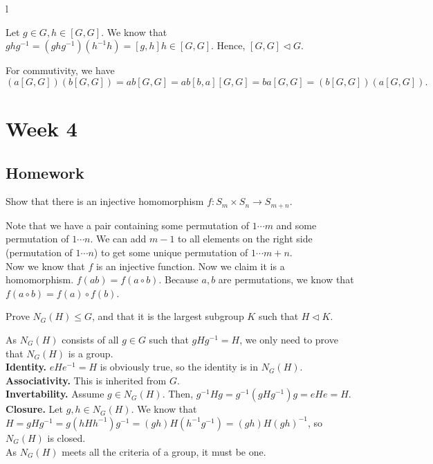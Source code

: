 l\documentclass{scrartcl}
\begin{document}
\begin{soln}
Let $g \in G, h \in [G,G].$ We know that $ghg^{-1} = (ghg^{-1})(h^{-1}h) = [g,h]h \in [G,G]$. Hence, $[G,G] \lhd G$. 

For commutivity, we have $$(a[G, G])(b[G, G]) = ab[G,G] = ab[b,a][G,G] = ba[G,G] = (b[G,G])(a[G,G]).$$
\end{soln}

\newpage
\section{Week 4}

\subsection{Homework}

\begin{problem}[1]
    Show that there is an injective homomorphism $f : S_m \times S_n \rightarrow S_{m+n}$.
\end{problem}

\begin{soln}
    Note that we have a pair containing some permutation of $1 \cdots m$ and some permutation of $1 \cdots n$. We can add $m-1$ to all elements on the right side (permutation of $1 \cdots n$) to get some unique permutation of $1 \cdots m+n$. \\
	Now we know that $f$ is an injective function. Now we claim it is a homomorphism. $f(ab) = f(a \circ b)$. Because $a,b$ are permutations, we know that $f(a \circ b) = f(a) \circ f(b)$.
\end{soln}

\begin{problem}[4]
	Prove $N_G(H) \le G$, and that it is the largest subgroup $K$ such that $H \lhd K$.
\end{problem}

\begin{soln}
	As $N_G(H)$ consists of all $g \in G$ such that $gHg^{-1} = H$, we only need to prove that $N_G(H)$ is a group. \\ 
	\textbf{Identity.} $eHe^{-1} = H$ is obviously true, so the identity is in $N_G(H)$. \\
	\textbf{Associativity.} This is inherited from $G$. \\ 
	\textbf{Invertability.} Assume $g \in N_G(H)$. Then, $g^{-1}Hg = g^{-1}(gHg^{-1})g = eHe = H$. \\
	\textbf{Closure.} Let $g, h \in N_G(H)$. We know that $H = gHg^{-1} = g(hHh^{-1})g^{-1} = (gh)H(h^{-1}g^{-1}) = (gh)H(gh)^{-1}$, so $N_G(H)$ is closed. \\
	As $N_G(H)$ meets all the criteria of a group, it must be one.
\end{soln}
\end{document}
